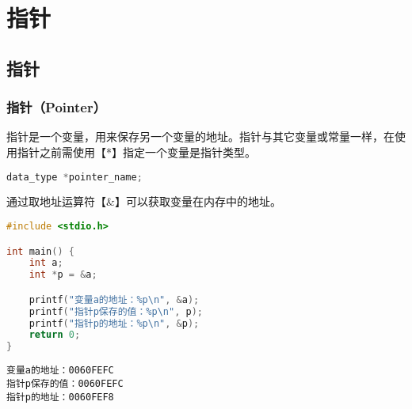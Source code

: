 \chapter{指针}

\section{指针}

\subsection{指针（Pointer）}

指针是一个变量，用来保存另一个变量的地址。指针与其它变量或常量一样，在使用指针之前需使用【*】指定一个变量是指针类型。

\vspace{-0.5cm}

\begin{lstlisting}[language=C]
data_type *pointer_name;
\end{lstlisting}

通过取地址运算符【\&】可以获取变量在内存中的地址。\\


\begin{lstlisting}[language=C]
#include <stdio.h>

int main() {
    int a;
    int *p = &a;

    printf("变量a的地址：%p\n", &a);
    printf("指针p保存的值：%p\n", p);
    printf("指针p的地址：%p\n", &p);
    return 0;
}
\end{lstlisting}

\begin{tcolorbox}
	\begin{verbatim}
变量a的地址：0060FEFC
指针p保存的值：0060FEFC
指针p的地址：0060FEF8
	\end{verbatim}
\end{tcolorbox}

\begin{figure}
	\centering
\end{figure}

